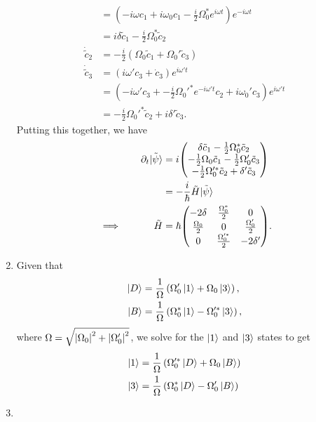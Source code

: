 \documentclass[12pt]{article}
\begin{document}
\begin{enumerate}[label=(\alph*)]
\begin{align*}
        &= \left(-i\omega c_1 + i\omega_0c_1 - \frac{i}{2}\Omega_0^*e^{i\omega t}\right)e^{-i\omega t} \\
        &= i\delta\tilde{c}_1 - \frac{i}{2}\Omega_0^*\tilde{c}_2 \\
        \dot{\tilde{c}}_2 &= -\frac{i}{2}\left(\Omega_0\tilde{c}_1 + \Omega_0'\tilde{c}_3\right) \\
        \dot{\tilde{c}}_3 &= \left(i\omega'c_3 + \dot{c}_3\right)e^{i\omega't} \\
        &= \left(-i\omega'c_3 + -\frac{i}{2}\Omega_0'^*e^{-i\omega't}c_2 + i\omega_0'c_3\right)e^{i\omega't} \\
        &= -\frac{i}{2}\Omega_0'^* \tilde{c}_2 + i\delta'\tilde{c}_3.
    \end{align*}
    Putting this together, we have
    \begin{alignat*}{3}
        &\quad & \partial_t \tilde{\ket{\psi}} &= i\mqty(\delta\tilde{c}_1 - \frac{1}{2}\Omega_0^*\tilde{c}_2 \\ -\frac{1}{2}\Omega_0\tilde{c}_1 - \frac{1}{2}\Omega_0'\tilde{c}_3 \\ -\frac{1}{2}\Omega_0'^*\tilde{c}_2 + \delta'\tilde{c}_3) \\
        &\quad & &= -\frac{i}{\hbar}\tilde{H}\tilde{\ket{\psi}} \\
        &\implies\quad & \tilde{H} &= \hbar\mqty(-2\delta & \frac{\Omega_0^*}{2} & 0 \\ \frac{\Omega_0}{2} & 0 & \frac{\Omega_0'}{2} \\ 0 & \frac{\Omega_0'^*}{2} & -2\delta').
    \end{alignat*}
    \item Given that
    \begin{align*}
        \ket{D} &= \frac{1}{\Omega}\left(\Omega_0'\ket{1} + \Omega_0\ket{3}\right), \\
        \ket{B} &= \frac{1}{\Omega}\left(\Omega_0^*\ket{1} - \Omega_0'^*\ket{3}\right),
    \end{align*}
    where $\Omega = \sqrt{\abs{\Omega_0}^2 + \abs{\Omega_0'}^2}$, we solve for the $\ket{1}$ and $\ket{3}$ states to get
    \begin{align*}
        \ket{1} &= \frac{1}{\Omega}\left(\Omega_0'^*\ket{D} + \Omega_0\ket{B}\right) \\
        \ket{3} &= \frac{1}{\Omega}\left(\Omega_0^*\ket{D} - \Omega_0'\ket{B}\right)
    \end{align*}
    \item
\end{enumerate}
\end{document}
